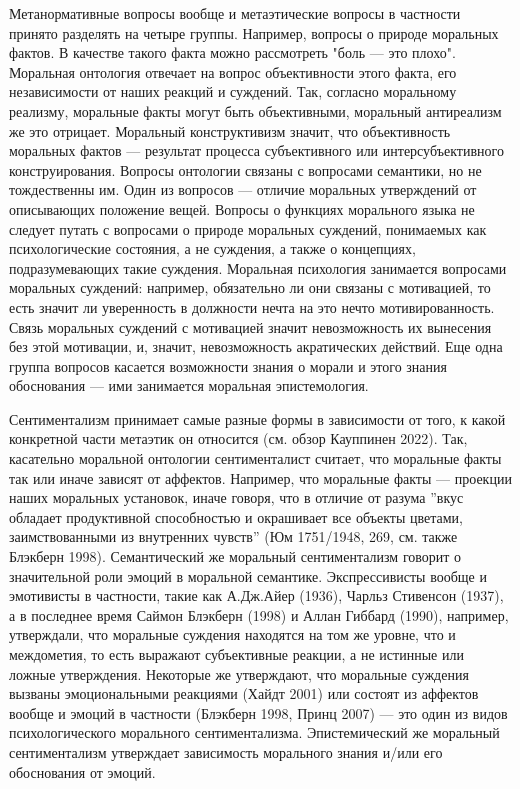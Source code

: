 \documentclass[11pt]{book}
\begin{document}
Метанормативные вопросы вообще и метаэтические вопросы в частности принято разделять на четыре группы. Например, вопросы о природе моральных фактов. В качестве такого факта можно рассмотреть "боль --- это плохо". Моральная онтология отвечает на вопрос объективности этого факта, его независимости от наших реакций и суждений. Так, согласно моральному реализму, моральные факты могут быть объективными, моральный антиреализм же это отрицает. Моральный конструктивизм значит, что объективность моральных фактов --- результат процесса субъективного или интерсубъективного конструирования. Вопросы онтологии связаны с вопросами семантики, но не тождественны им. Один из вопросов --- отличие моральных утверждений от описывающих положение вещей. Вопросы о функциях морального языка не следует путать с вопросами о природе моральных суждений, понимаемых как психологические состояния, а не суждения, а также о концепциях, подразумевающих такие суждения. Моральная психология занимается вопросами моральных суждений: например, обязательно ли они связаны с мотивацией, то есть значит ли уверенность в должности нечта на это нечто мотивированность. Связь моральных суждений с мотивацией значит невозможность их вынесения без этой мотивации, и, значит, невозможность акратических действий. Еще одна группа вопросов касается возможности знания о морали и этого знания обоснования --- ими занимается моральная эпистемология.

Сентиментализм принимает самые разные формы в зависимости от того, к какой конкретной части метаэтик он относится (см. обзор Кауппинен 2022). Так, касательно моральной онтологии сентименталист считает, что моральные факты так или иначе зависят от аффектов. Например, что моральные факты --- проекции наших моральных установок, иначе говоря, что в отличие от разума ''вкус обладает продуктивной способностью и окрашивает все объекты цветами, заимствованными из внутренних чувств'' (Юм 1751/1948, 269, см. также Блэкберн 1998). Семантический же моральный сентиментализм говорит о значительной роли эмоций в моральной семантике. Экспрессивисты вообще и эмотивисты в частности, такие как А.Дж.Айер (1936), Чарльз Стивенсон (1937), а в последнее время Саймон Блэкберн (1998) и Аллан Гиббард (1990), например, утверждали, что моральные суждения находятся на том же уровне, что и междометия, то есть выражают субъективные реакции, а не истинные или ложные утверждения. Некоторые же утверждают, что моральные суждения вызваны эмоциональными реакциями (Хайдт 2001) или состоят из аффектов вообще и эмоций в частности (Блэкберн 1998, Принц 2007) --- это один из видов психологического морального сентиментализма. Эпистемический же моральный сентиментализм утверждает зависимость морального знания и/или его обоснования от эмоций.
\end{document}
